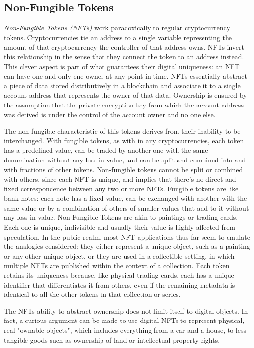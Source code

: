 \documentclass[../main.tex]{subfiles}
\begin{document}
\subsection{Non-Fungible Tokens}
\textit{Non-Fungible Tokens (NFTs)} work paradoxically to regular cryptocurrency tokens. Cryptocurrencies tie an address to a single variable representing the amount of that cryptocurrency the controller of that address owns. NFTs invert this relationship in the sense that they connect the token to an address instead. This clever aspect is part of what guarantees their digital uniqueness: an NFT can have one and only one owner at any point in time. NFTs essentially abstract a piece of data stored distributively in a blockchain and associate it to a single account address that represents the owner of that data. Ownership is ensured by the assumption that the private encryption key from which the account address was derived is under the control of the account owner and no one else.
\par
The non-fungible characteristic of this tokens derives from their inability to be interchanged. With fungible tokens, as with in any cryptocurrencies, each token has a predefined value, can be traded by another one with the same denomination without any loss in value, and can be split and combined into and with fractions of other tokens. Non-fungible tokens cannot be split or combined with others, since each NFT is unique, and implies that there's no direct and fixed correspondence between any two or more NFTs. Fungible tokens are like bank notes: each note has a fixed value, can be exchanged with another with the same value or by a combination of others of smaller values that add to it without any loss in value. Non-Fungible Tokens are akin to paintings or trading cards. Each one is unique, indivisible and usually their value is highly affected from speculation. In the public realm, most NFT applications thus far seem to emulate the analogies considered: they either represent a unique object, such as a painting or any other unique object, or they are used in a collectible setting, in which multiple NFTs are published within the context of a collection. Each token retains its uniqueness because, like physical trading cards, each has a unique identifier that differentiates it from others, even if the remaining metadata is identical to all the other tokens in that collection or series.
\par
The NFTs ability to abstract ownership does not limit itself to digital objects. In fact, a curious argument can be made to use digital NFTs to represent physical, real "ownable objects", which includes everything from a car and a house, to less tangible goods such as ownership of land or intellectual property rights.
\end{document}

